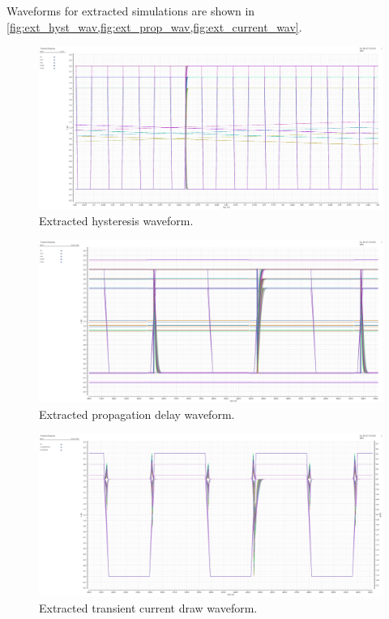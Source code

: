 \documentclass[11pt,letterpaper]{article}
\begin{document}
Waveforms for extracted simulations are shown in \cref{fig:ext_hyst_wav,fig:ext_prop_wav,fig:ext_current_wav}.

\begin{figure}[!t]
    \centering
    \includegraphics[width=\textwidth]{images/ext_hyst.png}
    \caption{Extracted hysteresis waveform.}
    \label{fig:ext_hyst_wav}
\end{figure}

\begin{figure}[!t]
    \centering
    \includegraphics[width=\textwidth]{images/ext_prop_icmr.png}
    \caption{Extracted propagation delay waveform.}
    \label{fig:ext_prop_wav}
\end{figure}

\begin{figure}[!t]
    \centering
    \includegraphics[width=\textwidth]{images/ext_current.png}
    \caption{Extracted transient current draw waveform.}
    \label{fig:ext_current_wav}
\end{figure}
\end{document}
